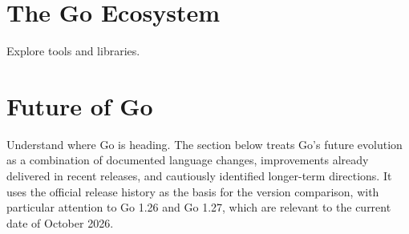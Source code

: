 \documentclass[12pt,oneside]{book}
\begin{document}
\chapter{The Go Ecosystem}
\begin{chaptersummary}
Explore tools and libraries.
\end{chaptersummary}


\chapter{Future of Go}
\begin{chaptersummary}
Understand where Go is heading. The section below treats Go's future evolution as a combination of documented language changes, improvements already delivered in recent releases, and cautiously identified longer-term directions. It uses the official release history as the basis for the version comparison, with particular attention to Go 1.26 and Go 1.27, which are relevant to the current date of October 2026.
\end{chaptersummary}


\appendix
\end{document}
